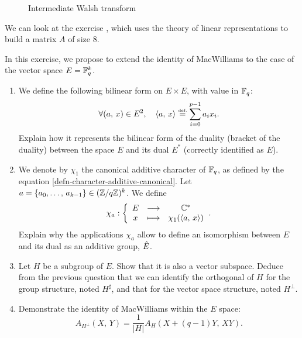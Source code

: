 \begin{exo}
\begin{figure}[ht]
\begin{center}
    \end{center}
    \caption{Intermediate Walsh transform}
              \label{fig-transfo-walsh-interm}
\end{figure}
We can look at the exercise , which uses the theory of linear representations to build a matrix $ A $ of size $ 8 $.
\end{exo}
 
 
\begin{exo}
\label{exo-generalization-mac-williams}
 
  In this exercise, we propose to extend the identity of MacWilliams to the case of the vector space $ E = \mathbb{F}_q^k $. \begin{enumerate}
\item We define the following bilinear form on $ E \times E $, with value in $ \mathbb{F}_q $:
\begin{equation*}
\forall (a, \, x) \in E^2, \quad \langle a,\,x\rangle \stackrel{\mbox{\upshape\tiny def.}}{=} \sum_{i = 0}^{p-1}{a_i x_i}.
\end{equation*}
Explain how it represents the bilinear form of the duality (bracket of the duality) between the space $ E $ and its dual $ E^* $ (correctly identified as $ E $).
\item We denote by $ \chi_1 $ the canonical additive character of $ \mathbb{F}_q $, as defined by the equation \eqref{defn-character-additive-canonical}. Let $ a = \{a_0, \ldots, \, a_{k-1}\} \in (\mathbb{Z}/q \mathbb{Z})^k $. We define
\begin{equation*}
\chi_a: {\left\{ \begin{array}{ccc} E & \longrightarrow & \mathbb{C}^* \\ x & \longmapsto & \chi_1 (\langle a,\,x\rangle) \end{array} \right.}.
\end{equation*}
Explain why the applications $ \chi_a $ allow to define an isomorphism between $ E $ and its dual as an additive group, $ \hat{E} $.
\item {}   Let $ H $ be a subgroup of $ E $. Show that it is also a vector subspace. Deduce from the previous question that we can identify the orthogonal of $ H $ for the group structure, noted $ H^{\sharp} $, and that for the vector space structure, noted $ H^{\bot} $.
\item Demonstrate the identity of MacWilliams within the $ E $ space:
\begin{equation*}
A_{H^{\bot}} (X, \, Y) = \frac{1}{| H |} A_{H} (X + (q-1) Y, \, XY).
\end{equation*}
\end{enumerate}
\end{exo}
 

